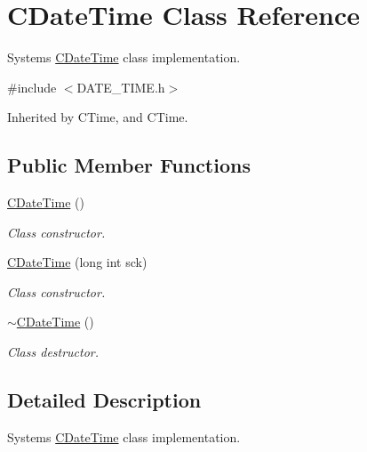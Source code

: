\hypertarget{class_c_date_time}{}\section{C\+Date\+Time Class Reference}
\label{class_c_date_time}


System\textquotesingle{}s \mbox{\hyperlink{class_c_date_time}{C\+Date\+Time}} class implementation.  




{\ttfamily \#include $<$D\+A\+T\+E\+\_\+\+T\+I\+M\+E.\+h$>$}



Inherited by C\+Time, and C\+Time.

\subsection*{Public Member Functions}
\begin{DoxyCompactItemize}
\item 
\mbox{\label{class_c_date_time_a84f3f82e4856f510db8cace1e2c4b9a7}} 
\mbox{\hyperlink{class_c_date_time_a84f3f82e4856f510db8cace1e2c4b9a7}{C\+Date\+Time}} ()
\begin{DoxyCompactList}\small\item\em Class constructor. \end{DoxyCompactList}\item 
\mbox{\label{class_c_date_time_aba2df38e58c26268a205d5e54a5d21bd}} 
\mbox{\hyperlink{class_c_date_time_aba2df38e58c26268a205d5e54a5d21bd}{C\+Date\+Time}} (long int sck)
\begin{DoxyCompactList}\small\item\em Class constructor. \end{DoxyCompactList}\item 
\mbox{\label{class_c_date_time_a1412c07bae2ac253df8d4708e0037162}} 
\mbox{\hyperlink{class_c_date_time_a1412c07bae2ac253df8d4708e0037162}{$\sim$\+C\+Date\+Time}} ()
\begin{DoxyCompactList}\small\item\em Class destructor. \end{DoxyCompactList}\end{DoxyCompactItemize}


\subsection{Detailed Description}
System\textquotesingle{}s \mbox{\hyperlink{class_c_date_time}{C\+Date\+Time}} class implementation. 

